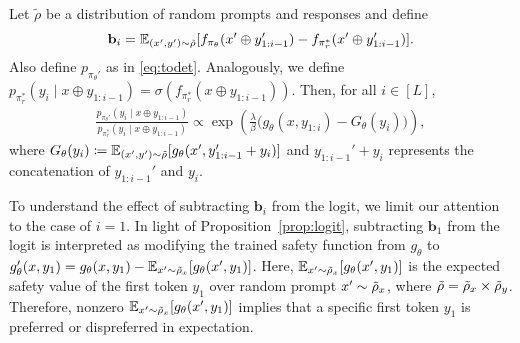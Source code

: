 \begin{proposition}\label{prop:logit}
Let $\tilde{\rho}$ be a distribution of random prompts and responses and define
%
\begin{equation*}
\mathbf{b}_{i} = \mathbb{E}_{(x', y') \sim \tilde{\rho}}[ f_{\pi_\theta}(x' \oplus y_{1:i-1}') - f_{\pi_r^*}(x' \oplus y_{1:i-1}') ].
\end{equation*}
%
Also define $p_{\pi_\theta'}$ as in \eqref{eq:todet}.
Analogously, we define $p_{\pi_r^*}(y_i \mid x \oplus y_{1:i-1}) = \sigma(f_{\pi_r^*}(x \oplus y_{1:i-1}))$.
Then, for all $i \in [L]$, 
%
\begin{align*}
\frac{ p_{\pi_\theta'}(y_i \mid x \oplus y_{1:i-1})}{p_{\pi_r^*}(y_i \mid x \oplus y_{1:i-1}) } \propto \exp\left( \frac{\lambda}{\beta} \bigl(g_\theta(x, y_{1:i}) - G_\theta(y_i) \bigr) \right),
\end{align*}
%
where $G_\theta(y_i) \coloneqq \mathbb{E}_{(x',y') \sim \tilde{\rho}}[g_\theta(x', y_{1:i-1}'+y_i)]$ and $y_{1:i-1}'+y_i$ represents the concatenation of $y_{1:i-1}'$ and $y_i$.
\end{proposition}



To understand the effect of subtracting $\mathbf{b}_i$ from the logit, we limit our attention to the case of $i = 1$.
In light of Proposition~\ref{prop:logit}, subtracting $\mathbf{b}_1$ from the logit is interpreted as modifying the trained safety function from $g_\theta$ to $g_\theta'(x, y_1) = g_\theta(x, y_1) - \mathbb{E}_{x'\sim \tilde{\rho}_x}[g_\theta(x', y_1)]$. Here, $\mathbb{E}_{x' \sim \tilde{\rho}_x}[g_\theta(x', y_1)]$ is the expected safety value of the first token $y_1$ over random prompt $x' \sim \tilde{\rho}_x$, where $\tilde{\rho} = \tilde{\rho}_x \times \tilde{\rho}_y$. 
Therefore, nonzero $\mathbb{E}_{x' \sim \tilde{\rho}_x}[g_\theta(x', y_1)]$ implies that a specific first token $y_1$ is preferred or dispreferred in expectation. 

